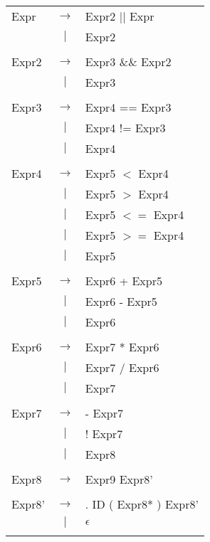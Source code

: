 \documentclass{article}
\begin{document}
\begin{tabular}{ l c l }

	Expr & $\rightarrow$ & Expr2 $||$ Expr \\
	&$|$& Expr2 \\
	\\

	Expr2 & $\rightarrow$ & Expr3 $\&\&$ Expr2 \\
	&$|$& Expr3 \\
	\\

	Expr3 & $\rightarrow$ & Expr4 == Expr3 \\
	&$|$& Expr4 != Expr3 \\
	&$|$& Expr4 \\
	\\

	Expr4 & $\rightarrow$ & Expr5 $<$ Expr4 \\
	&$|$& Expr5 $>$ Expr4 \\
	&$|$& Expr5 $<=$ Expr4 \\
	&$|$& Expr5 $>=$ Expr4 \\
	&$|$& Expr5 \\
	\\

	Expr5 & $\rightarrow$ & Expr6 + Expr5 \\
	&$|$& Expr6 - Expr5 \\
	&$|$& Expr6 \\
	\\

	Expr6 & $\rightarrow$ & Expr7 * Expr6 \\
	&$|$& Expr7 / Expr6 \\
	&$|$& Expr7 \\
	\\

	Expr7 & $\rightarrow$ & - Expr7 \\
	&$|$& ! Expr7 \\
	&$|$& Expr8 \\
	\\

	Expr8 & $\rightarrow$ & Expr9 Expr8' \\
	\\

	Expr8' & $\rightarrow$ & . ID ( Expr8* ) Expr8' \\
	&$|$& $\epsilon$ \\
	\\
	


\end{tabular}
\end{document}
